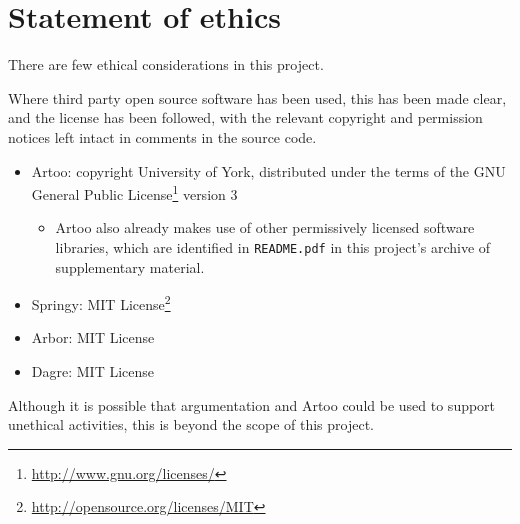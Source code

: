 \section{Statement of ethics}

There are few ethical considerations in this project.

Where third party open source software has been used, this has been made clear, and the license has been followed, with the relevant copyright and permission notices left intact in comments in the source code.

\begin{itemize}
\item Artoo: copyright  University of York, distributed under the terms of the GNU General Public License\footnote{\url{http://www.gnu.org/licenses/}} version 3
    \begin{itemize}
    \item Artoo also already makes use of other permissively licensed software libraries, which are identified in \texttt{README.pdf} in this project's archive of supplementary material.
    \end{itemize}
\item Springy: MIT License\footnote{\url{http://opensource.org/licenses/MIT}}
\item Arbor: MIT License
\item Dagre: MIT License
\end{itemize}

Although it is possible that argumentation and Artoo could be used to support unethical activities, this is beyond the scope of this project.
